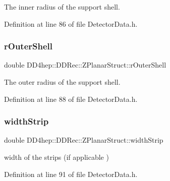 The inner radius of the support shell. 



Definition at line 86 of file Detector\+Data.\+h.

\hypertarget{struct_d_d4hep_1_1_d_d_rec_1_1_z_planar_struct_a298b12433c81ef9750730620293f7cfa}{}\label{struct_d_d4hep_1_1_d_d_rec_1_1_z_planar_struct_a298b12433c81ef9750730620293f7cfa} 
\subsubsection{\texorpdfstring{r\+Outer\+Shell}{rOuterShell}}
{\footnotesize\ttfamily double D\+D4hep\+::\+D\+D\+Rec\+::\+Z\+Planar\+Struct\+::r\+Outer\+Shell}



The outer radius of the support shell. 



Definition at line 88 of file Detector\+Data.\+h.

\hypertarget{struct_d_d4hep_1_1_d_d_rec_1_1_z_planar_struct_af557ea4c315a65436763c0b2b91750ff}{}\label{struct_d_d4hep_1_1_d_d_rec_1_1_z_planar_struct_af557ea4c315a65436763c0b2b91750ff} 
\subsubsection{\texorpdfstring{width\+Strip}{widthStrip}}
{\footnotesize\ttfamily double D\+D4hep\+::\+D\+D\+Rec\+::\+Z\+Planar\+Struct\+::width\+Strip}



width of the strips (if applicable ) 



Definition at line 91 of file Detector\+Data.\+h.

\hypertarget{struct_d_d4hep_1_1_d_d_rec_1_1_z_planar_struct_acd368faf55766bd4b57296660458185c}{}\label{struct_d_d4hep_1_1_d_d_rec_1_1_z_planar_struct_acd368faf55766bd4b57296660458185c} 
